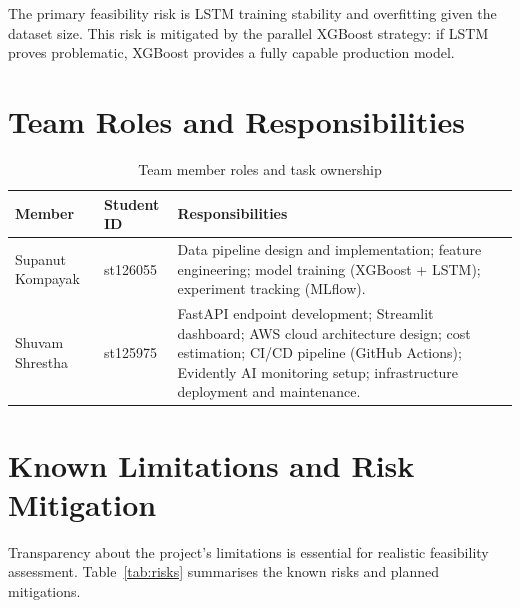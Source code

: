 \documentclass[12pt,a4paper]{report}
\begin{document}
The primary feasibility risk is LSTM training stability and overfitting given the dataset size. This risk is mitigated by the parallel XGBoost strategy: if LSTM proves problematic, XGBoost provides a fully capable production model.

\section{Team Roles and Responsibilities}

\begin{table}[H]
\centering
\caption{Team member roles and task ownership}
\label{tab:team_roles}
\begin{tabularx}{\textwidth}{@{}llX@{}}
\toprule
\textbf{Member} & \textbf{Student ID} & \textbf{Responsibilities} \\
\midrule
Supanut Kompayak &
  st126055 &
  Data pipeline design and implementation; feature engineering; model training (XGBoost + LSTM); experiment tracking (MLflow). \\[6pt]
Shuvam Shrestha &
  st125975 &
  FastAPI endpoint development; Streamlit dashboard;
  AWS cloud architecture design; cost estimation; CI/CD pipeline (GitHub Actions); Evidently AI monitoring setup; infrastructure deployment and maintenance. \\
\bottomrule
\end{tabularx}
\end{table}

\section{Known Limitations and Risk Mitigation}

Transparency about the project's limitations is essential for realistic feasibility assessment. Table~\ref{tab:risks} summarises the known risks and planned mitigations.
\end{document}
